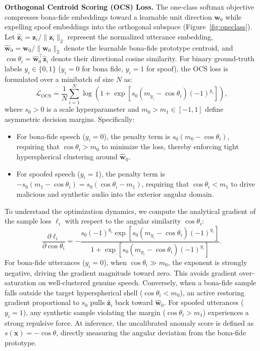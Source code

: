 \noindent\textbf{Orthogonal Centroid Scoring (OCS) Loss.} The one-class softmax objective~\cite{zhang2021oneclass} compresses bona-fide embeddings toward a learnable unit direction $\mathbf{w}_0$ while expelling spoof embeddings into the orthogonal subspace (Figure~\ref{fig:oneclass}). Let $\hat{\mathbf{z}}_i = \mathbf{z}_i / \|\mathbf{z}_i\|_2$ represent the normalized utterance embedding, $\hat{\mathbf{w}}_0 = \mathbf{w}_0 / \|\mathbf{w}_0\|_2$ denote the learnable bona-fide prototype centroid, and $\cos\theta_i = \hat{\mathbf{w}}_0^\top \hat{\mathbf{z}}_i$ denote their directional cosine similarity. For binary ground-truth labels $y_i \in \{0, 1\}$ ($y_i = 0$ for bona fide, $y_i = 1$ for spoof), the OCS loss is formulated over a minibatch of size $N$ as:
\begin{equation}
\mathcal{L}_{\text{OCS}} = \frac{1}{N}\sum_{i=1}^{N} \log\!\left(1 + \exp\left[ s_0 \left( m_{y_i} - \cos\theta_i \right) (-1)^{y_i} \right]\right),
\label{eq:ocs}
\end{equation}
where $s_0 > 0$ is a scale hyperparameter and $m_0 > m_1 \in [-1, 1]$ define asymmetric decision margins. Specifically:
\begin{itemize}
\item For bona-fide speech ($y_i = 0$), the penalty term is $s_0 (m_0 - \cos\theta_i)$, requiring that $\cos\theta_i > m_0$ to minimize the loss, thereby enforcing tight hyperspherical clustering around $\hat{\mathbf{w}}_0$.
\item For spoofed speech ($y_i = 1$), the penalty term is $-s_0 (m_1 - \cos\theta_i) = s_0 (\cos\theta_i - m_1)$, requiring that $\cos\theta_i < m_1$ to drive malicious and synthetic audio into the exterior angular domain.
\end{itemize}

To understand the optimization dynamics, we compute the analytical gradient of the sample loss $\ell_i$ with respect to the angular similarity $\cos\theta_i$:
\begin{equation}
\frac{\partial \ell_i}{\partial \cos\theta_i} = - \frac{s_0 (-1)^{y_i} \exp\left[ s_0 (m_{y_i} - \cos\theta_i)(-1)^{y_i} \right]}{1 + \exp\left[ s_0 (m_{y_i} - \cos\theta_i)(-1)^{y_i} \right]}.
\label{eq:ocs_grad}
\end{equation}
For bona-fide utterances ($y_i = 0$), when $\cos\theta_i \gg m_0$, the exponent is strongly negative, driving the gradient magnitude toward zero. This avoids gradient over-saturation on well-clustered genuine speech. Conversely, when a bona-fide sample falls outside the target hyperspherical shell ($\cos\theta_i < m_0$), an active restoring gradient proportional to $s_0$ pulls $\hat{\mathbf{z}}_i$ back toward $\hat{\mathbf{w}}_0$. For spoofed utterances ($y_i = 1$), any synthetic sample violating the margin ($\cos\theta_i > m_1$) experiences a strong repulsive force. At inference, the uncalibrated anomaly score is defined as $s(\mathbf{x}) = -\cos\theta$, directly measuring the angular deviation from the bona-fide prototype.

